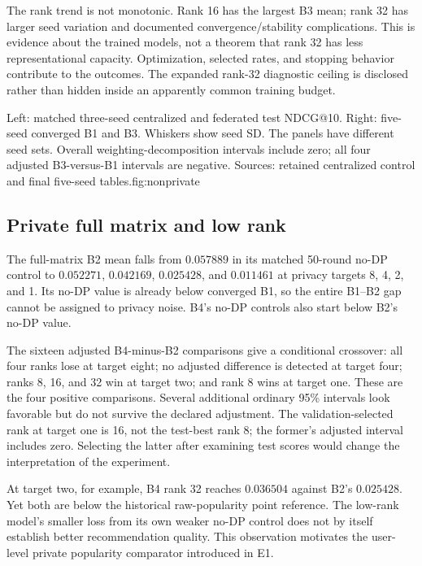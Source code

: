 The rank trend is not monotonic. Rank 16 has the largest B3 mean; rank 32 has
larger seed variation and documented convergence/stability complications.
This is evidence about the trained models, not a theorem that rank 32 has
less representational capacity. Optimization, selected rates, and stopping
behavior contribute to the outcomes. The expanded rank-32 diagnostic ceiling
is disclosed rather than hidden inside an apparently common training budget.

{Left: matched three-seed centralized and federated test NDCG@10. Right:
five-seed converged B1 and B3. Whiskers show seed SD. The panels have different
seed sets. Overall weighting-decomposition intervals include zero; all four
adjusted B3-versus-B1 intervals are negative. Sources: retained centralized
control and final five-seed tables.}{fig:nonprivate}

\subsection{Private full matrix and low rank}

The full-matrix B2 mean falls from $0.057889$ in its matched 50-round no-DP
control to $0.052271$, $0.042169$, $0.025428$, and $0.011461$ at privacy
targets 8, 4, 2, and 1. Its no-DP value is already below converged B1, so
the entire B1--B2 gap cannot be assigned to privacy noise. B4's no-DP controls
also start below B2's no-DP value.

The sixteen adjusted B4-minus-B2 comparisons give a conditional crossover:
all four ranks lose at target eight; no adjusted difference is detected at
target four; ranks 8, 16, and 32 win at target two; and rank 8 wins at target
one. These are the four positive comparisons. Several additional ordinary
95\% intervals look favorable but do not survive the declared adjustment.
The validation-selected rank at target one is 16, not the test-best rank 8;
the former's adjusted interval includes zero. Selecting the latter after
examining test scores would change the interpretation of the experiment.

At target two, for example, B4 rank 32 reaches $0.036504$ against B2's
$0.025428$. Yet both are below the historical raw-popularity point reference.
The low-rank model's smaller loss from its own weaker no-DP control does not
by itself establish better recommendation quality. This observation motivates
the user-level private popularity comparator introduced in E1.

